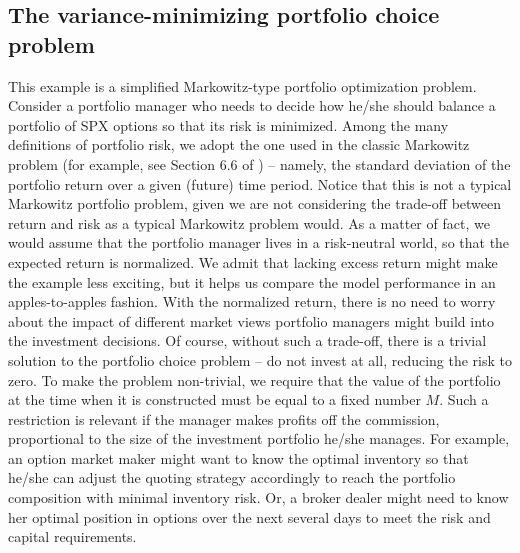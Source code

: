 \documentclass{article}
\numberwithin{equation}{section}
\begin{document}
\subsection{The variance-minimizing portfolio choice problem}
This example is a simplified Markowitz-type portfolio optimization problem. Consider a portfolio manager who needs to decide how he/she should balance a portfolio of SPX options so that its risk is minimized. Among the many definitions of portfolio risk, we adopt the one used in the classic Markowitz problem (for example, see Section 6.6 of \cite{luenberger1997investment}) -- namely, the standard deviation of the portfolio return over a given (future) time period. 
Notice that this is not a typical Markowitz portfolio problem, given we are not considering the trade-off between return and risk as a typical Markowitz problem would. As a matter of fact, we would assume that the portfolio manager lives in a risk-neutral world, so that the expected return is normalized. We admit that lacking excess return might make the example less exciting, but it helps us compare the model performance in an apples-to-apples fashion. With the normalized return, there is no need to worry about the impact of different market views portfolio managers might build into the investment decisions. Of course, without such a trade-off, there is a trivial solution to the portfolio choice problem -- do not invest at all, reducing the risk to zero. To make the problem non-trivial, we require that the value of the portfolio at the time when it is constructed must be equal to a fixed number $M$. Such a restriction is relevant if the manager makes profits off the commission, proportional to the size of the investment portfolio he/she manages. For example, an option market maker might want to know the optimal inventory so that he/she can adjust the quoting strategy accordingly to reach the portfolio composition with minimal inventory risk. Or, a broker dealer might need to know her optimal position in options over the next several days to meet the risk and capital requirements. 
\end{document}
